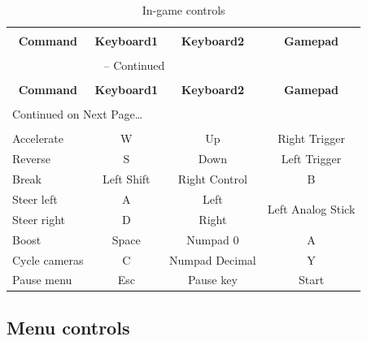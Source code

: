 \documentclass[11pt]{article}
\begin{document}
\begin{center}
\begin{longtable}{lccc}
\caption{In-game controls} \label{ingame-controls-table} \\

\hline \hline \\[-2ex]
   \multicolumn{1}{c}{\textbf{Command}} &
   \multicolumn{1}{c}{\textbf{Keyboard1}} &
   \multicolumn{1}{c}{\textbf{Keyboard2}} &
   \multicolumn{1}{c}{\textbf{Gamepad}} \\[0.5ex] \hline
   \\[-1.8ex]
\endfirsthead

\multicolumn{3}{c}{{\tablename} \thetable{} -- Continued} \\[0.5ex]
  \hline \hline \\[-2ex]
  \multicolumn{1}{c}{\textbf{Command}} &
  \multicolumn{1}{c}{\textbf{Keyboard1}} &
  \multicolumn{1}{c}{\textbf{Keyboard2}} &
  \multicolumn{1}{c}{\textbf{Gamepad}} \\[0.5ex] \hline
  \\[-1.8ex]
\endhead

  \multicolumn{3}{l}{{Continued on Next Page\ldots}} \\
\endfoot

  \\[-1.8ex] \hline \hline
\endlastfoot

Accelerate & W & Up & Right Trigger \\ 
Reverse & S & Down & Left Trigger \\
Break & Left Shift & Right Control & B \\ 
Steer left & A & Left & \multirow{2}{*}{Left Analog Stick} \\ 
Steer right & D & Right \\
Boost & Space & Numpad 0 & A \\
Cycle cameras & C & Numpad Decimal & Y \\
Pause menu & Esc & Pause key & Start \\
\end{longtable}
\end{center}

\subsection{Menu controls}
\end{document}
